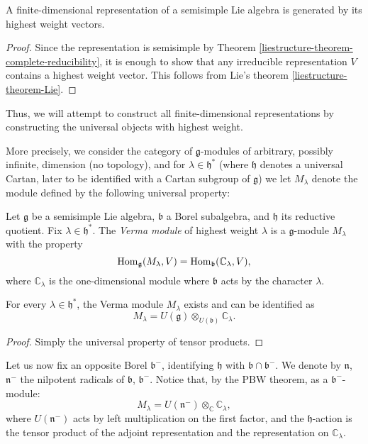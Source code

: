 \begin{lemma}
 \label{lemma-generated-highestweight}
A finite-dimensional representation of a semisimple Lie algebra is generated by its highest weight vectors.
\end{lemma}

\begin{proof}
Since the representation is semisimple by Theorem \ref{liestructure-theorem-complete-reducibility}, it is enough to show that any irreducible representation $V$ contains a highest weight vector. This follows from Lie's theorem \ref{liestructure-theorem-Lie}. 
\end{proof}



Thus, we will attempt to construct all finite-dimensional representations by constructing the universal objects with highest weight.

More precisely, we consider the category of $\mathfrak g$-modules of arbitrary, possibly infinite, dimension (no topology), and for $\lambda\in \mathfrak h^*$ (where $\mathfrak h$ denotes a universal Cartan, later to be identified with a Cartan subgroup of $\mathfrak g$) we let $M_\lambda$ denote the module defined by the following universal property:

\begin{definition}
\label{definition-Verma-module}
Let $\mathfrak g$ be a semisimple Lie algebra, $\mathfrak b$ a Borel subalgebra, and $\mathfrak h$ its reductive quotient.
Fix $\lambda\in \mathfrak h^*$. The {\it Verma module} of highest weight $\lambda$ is a $\mathfrak g$-module $M_\lambda$ with the property 
$$\mathop{\rm Hom}\nolimits_{\mathfrak g}(M_\lambda, V) = \mathop{\rm Hom}\nolimits_{\mathfrak b} (\mathbb C_\lambda,V),$$
where $\mathbb C_\lambda$ is the one-dimensional module where $\mathfrak b$ acts by the character $\lambda$.
\end{definition}

\begin{lemma}
\label{lemma-Verma-exists}
For every $\lambda\in\mathfrak h^*$, the Verma module $M_\lambda$ exists and can be identified as
$$M_\lambda = U(\mathfrak g)\otimes_{U(\mathfrak b)} \mathbb C_\lambda.$$
\end{lemma}

\begin{proof}
 Simply the universal property of tensor products.
\end{proof}

Let us now fix an opposite Borel $\mathfrak b^-$, identifying $\mathfrak h$ with $\mathfrak b \cap \mathfrak b^-$. We denote by $\mathfrak n$, $\mathfrak n^-$ the nilpotent radicals of $\mathfrak b$, $\mathfrak b^-$.
Notice that, by the PBW theorem, as a $\mathfrak b^-$-module:
\begin{equation}\label{Vermastructure}M_\lambda = U(\mathfrak n^-)\otimes_{\mathbb C} \mathbb C_{\lambda},
\end{equation}
where $U(\mathfrak n^-)$ acts by left multiplication on the first factor, and the $\mathfrak h$-action is the tensor product of the adjoint representation and the representation on $\mathbb C_{\lambda}$. 

